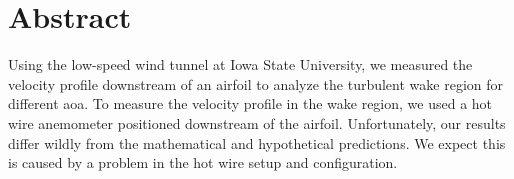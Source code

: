 \thispagestyle{plain} %



\chapter*{Abstract} %

Using the low-speed wind tunnel at Iowa State University, we measured the velocity profile downstream of an airfoil to analyze the turbulent wake region for different \acrfull{aoa}. To measure the velocity profile in the wake region, we used a hot wire anemometer positioned downstream of the airfoil. Unfortunately, our results differ wildly from the mathematical and hypothetical predictions. We expect this is caused by a problem in the hot wire setup and configuration.



